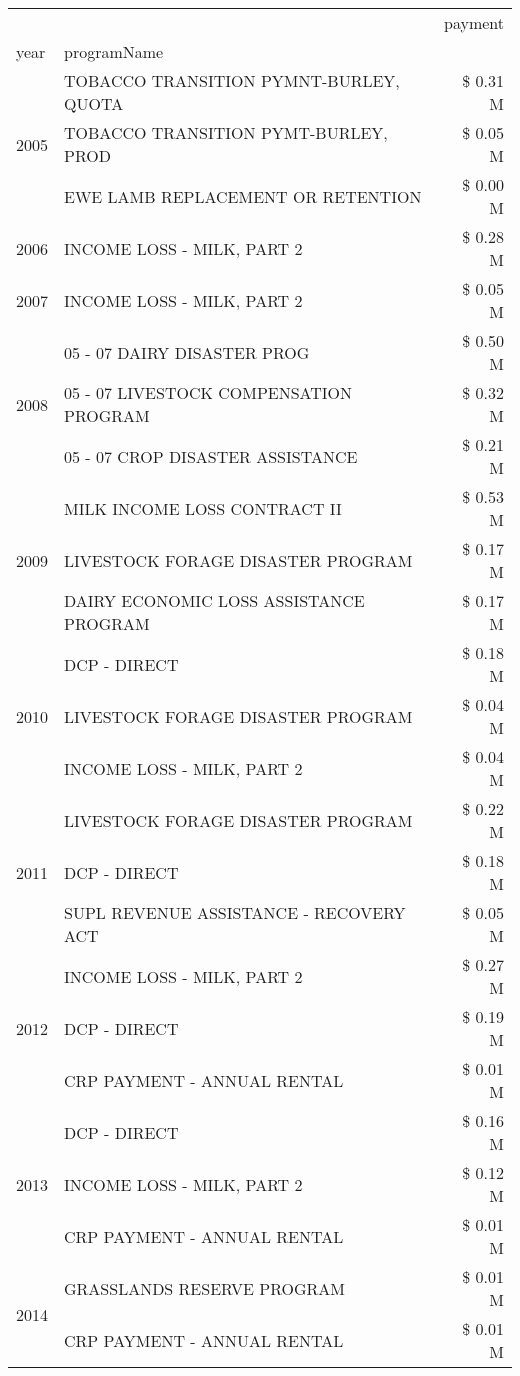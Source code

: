 \begin{tabular}{llr}
\toprule
 &  & payment \\
year & programName &  \\
\midrule
\multirow[t]{3}{*}{2005} & TOBACCO TRANSITION PYMNT-BURLEY, QUOTA & \$ 0.31 M \\
 & TOBACCO TRANSITION PYMT-BURLEY, PROD & \$ 0.05 M \\
 & EWE LAMB REPLACEMENT OR RETENTION & \$ 0.00 M \\
\cline{1-3}
2006 & INCOME LOSS - MILK, PART 2 & \$ 0.28 M \\
\cline{1-3}
2007 & INCOME LOSS - MILK, PART 2 & \$ 0.05 M \\
\cline{1-3}
\multirow[t]{3}{*}{2008} & 05 - 07 DAIRY DISASTER PROG & \$ 0.50 M \\
 & 05 - 07 LIVESTOCK COMPENSATION PROGRAM & \$ 0.32 M \\
 & 05 - 07 CROP DISASTER ASSISTANCE & \$ 0.21 M \\
\cline{1-3}
\multirow[t]{3}{*}{2009} & MILK INCOME LOSS CONTRACT II & \$ 0.53 M \\
 & LIVESTOCK FORAGE DISASTER  PROGRAM & \$ 0.17 M \\
 & DAIRY ECONOMIC LOSS ASSISTANCE PROGRAM & \$ 0.17 M \\
\cline{1-3}
\multirow[t]{3}{*}{2010} & DCP - DIRECT & \$ 0.18 M \\
 & LIVESTOCK FORAGE DISASTER PROGRAM & \$ 0.04 M \\
 & INCOME LOSS - MILK, PART 2 & \$ 0.04 M \\
\cline{1-3}
\multirow[t]{3}{*}{2011} & LIVESTOCK FORAGE DISASTER PROGRAM & \$ 0.22 M \\
 & DCP - DIRECT & \$ 0.18 M \\
 & SUPL REVENUE ASSISTANCE - RECOVERY ACT & \$ 0.05 M \\
\cline{1-3}
\multirow[t]{3}{*}{2012} & INCOME LOSS - MILK, PART 2 & \$ 0.27 M \\
 & DCP - DIRECT & \$ 0.19 M \\
 & CRP PAYMENT - ANNUAL RENTAL & \$ 0.01 M \\
\cline{1-3}
\multirow[t]{3}{*}{2013} & DCP - DIRECT & \$ 0.16 M \\
 & INCOME LOSS - MILK, PART 2 & \$ 0.12 M \\
 & CRP PAYMENT - ANNUAL RENTAL & \$ 0.01 M \\
\cline{1-3}
\multirow[t]{3}{*}{2014} & GRASSLANDS RESERVE PROGRAM & \$ 0.01 M \\
 & CRP PAYMENT - ANNUAL RENTAL & \$ 0.01 M \\

\end{tabular}
